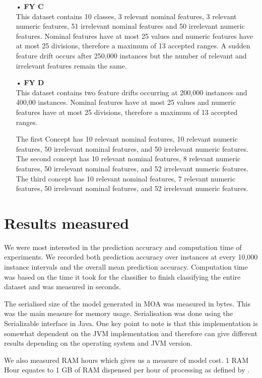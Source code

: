 \begin{itemize}
\item[•]\textbf{FY C}\\
This dataset contains 10 classes, 3 relevant nominal features, 3 relevant numeric features, 51 irrelevant nominal features and 50 irrelevant numeric features. Nominal features have at most 25 values and numeric features have at most 25 divisions, therefore a maximum of 13 accepted ranges. A sudden feature drift occurs after 250,000 instances but the number of relevant and irrelevant features remain the same.

\item[•]\textbf{FY D}\\
This dataset contains two feature drifts occurring at 200,000 instances and 400,00 instances. Nominal features have at most 25 values and numeric features have at most 25 divisions, therefore a maximum of 13 accepted ranges. 

The first Concept has 10 relevant nominal features, 10 relevant numeric features, 50 irrelevant nominal features, and 50 irrelevant numeric features. The second concept has 10 relevant nominal features, 8 relevant numeric features, 50 irrelevant nominal features, and 52 irrelevant numeric features. The third concept has 10 relevant nominal features, 7 relevant numeric features, 50 irrelevant nominal features, and 52 irrelevant numeric features.
\end{itemize}

\section{Results measured}
We were most interested in the prediction accuracy and computation time of experiments. We recorded both prediction accuracy over instances at every 10,000 instance intervals and the overall mean prediction accuracy. Computation time was based on the time it took for the classifier to finish classifying the entire dataset and was measured in seconds. 

The serialised size of the model generated in MOA was measured in bytes. This was the main measure for memory usage. Serialisation was done using the Serializable interface in Java. One key point to note is that this implementation is somewhat dependent on the JVM implementation and therefore can give different results depending on the operating system and JVM version.

We also measured RAM hours which gives us a measure of model cost. 1 RAM Hour equates to 1 GB of RAM dispensed per hour of processing as defined by \citet{bifet2010fast}.